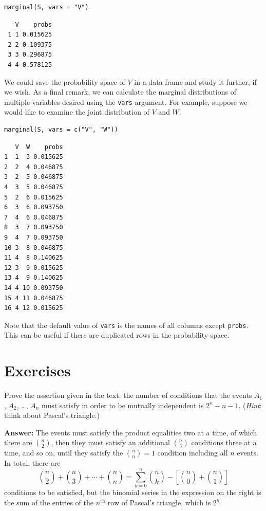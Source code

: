 \documentclass[captions=tableheading]{scrbook}
\begin{document}
\lstset{language=R}
\begin{lstlisting}
marginal(S, vars = "V")
\end{lstlisting}

\begin{verbatim}
   V    probs
 1 1 0.015625
 2 2 0.109375
 3 3 0.296875
 4 4 0.578125
\end{verbatim}

We could save the probability space of \(V\) in a data frame and study it further, if we wish. As a final remark, we can calculate the marginal distributions of multiple variables desired using the \texttt{vars} argument. For example, suppose we would like to examine the joint distribution of \(V\) and \(W\). 


\lstset{language=R}
\begin{lstlisting}
marginal(S, vars = c("V", "W"))
\end{lstlisting}


\begin{verbatim}
   V  W    probs
1  1  3 0.015625
2  2  4 0.046875
3  2  5 0.046875
4  3  5 0.046875
5  2  6 0.015625
6  3  6 0.093750
7  4  6 0.046875
8  3  7 0.093750
9  4  7 0.093750
10 3  8 0.046875
11 4  8 0.140625
12 3  9 0.015625
13 4  9 0.140625
14 4 10 0.093750
15 4 11 0.046875
16 4 12 0.015625
\end{verbatim}

Note that the default value of \texttt{vars} is the names of all columns except \texttt{probs}. This can be useful if there are duplicated rows in the probability space.

\newpage{}
\section{Exercises}
\label{sec-4-10}


\setcounter{thm}{0}

\begin{xca}
Prove the assertion given in the text: the number of conditions that the events \(A_{1}\), \(A_{2}\), \ldots{}, \(A_{n}\) must satisfy in order to be mutually independent is \(2^{n}-n-1\). (\emph{Hint}: think about Pascal's triangle.)
\end{xca}

\textbf{Answer:}
The events must satisfy the product equalities two at a time, of which there are \({n \choose 2}\), then they must satisfy an additional \({n \choose 3}\) conditions three at a time, and so on, until they satisfy the \({n \choose n}=1\) condition including all \(n\) events. In total, there are 
\[
{n \choose 2}+{n \choose 3}+\cdots+{n \choose n}=\sum_{k=0}^{n}{n \choose k}-\left[{n \choose 0}+{n \choose 1}\right]
\]
conditions to be satisfied, but the binomial series in the expression on the right is the sum of the entries of the \(n^{\mathrm{th}}\) row of Pascal's triangle, which is \(2^{n}\).
\end{document}
